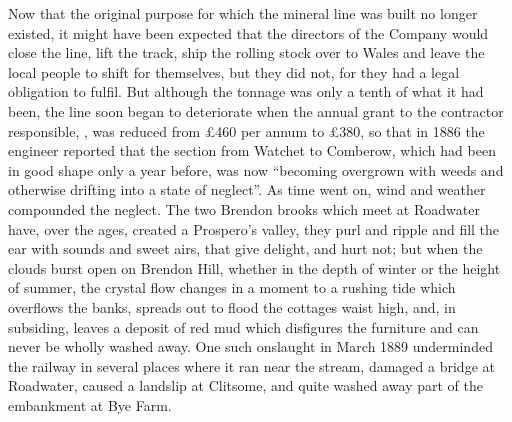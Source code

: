 \documentclass[11pt]{book}
\begin{document}
   Now that the original purpose for which the mineral line was built no longer existed, it might have been expected that the directors of the Company would close the line, lift the track, ship the rolling stock over to Wales and leave the local people to shift for themselves, but they did not, for they had a legal obligation to fulfil.  But although the tonnage was only a tenth of what it had been, the line soon began to deteriorate when the annual grant to the contractor responsible,                      , was reduced from £460 per annum to £380, so that in 1886 the engineer reported that the section from Watchet to Comberow, which had been in good shape only a year before, was now “becoming overgrown with weeds and otherwise drifting into a state of neglect”. As time went on, wind and weather compounded the neglect. The two Brendon brooks which meet at Roadwater have, over the ages, created a Prospero’s valley, they purl and ripple and fill the ear with sounds and sweet airs, that give delight, and hurt not; but when the clouds burst open on Brendon Hill, whether in the depth of winter or the height of summer, the crystal flow changes in a moment to a rushing  tide which overflows the banks, spreads out  to flood the cottages waist high, and, in subsiding, leaves a deposit of red mud which disfigures the furniture and can never be wholly washed away. One such onslaught in March 1889 underminded the railway in several places where it ran near the stream, damaged a bridge at Roadwater, caused a landslip at Clitsome, and quite washed away part of the embankment at Bye Farm.                                                                                                                                                                                      
   
\end{document}
